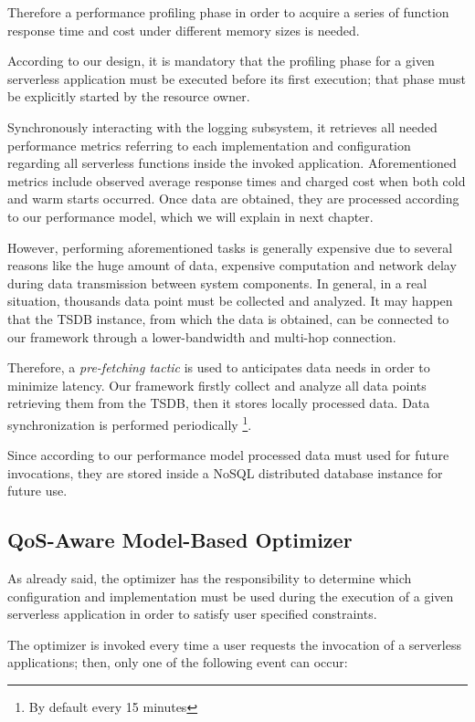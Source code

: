 \documentclass[12pt,a4paper]{report}
\begin{document}
Therefore a performance profiling phase in order to acquire a series of function response time and cost under different memory sizes is needed. 

According to our design, it is mandatory that the profiling phase for a given serverless application must be executed before its first execution; that phase must be explicitly started by the resource owner.

Synchronously interacting with the logging subsystem, it retrieves all needed performance metrics referring to each implementation and configuration regarding all serverless functions inside the invoked application. Aforementioned metrics include observed average response times and charged cost when both cold and warm starts occurred. Once data are obtained, they are processed according to our performance model, which we will explain in next chapter.

However, performing aforementioned tasks is generally expensive due to several reasons like the huge amount of data, expensive computation and network delay during data transmission between system components. In general, in a real situation, thousands data point must be collected and analyzed. It may happen that the TSDB instance, from which the data is obtained, can be connected to our framework through a lower-bandwidth and multi-hop connection. 

Therefore, a \textit{pre-fetching tactic} is used to anticipates data needs in order to minimize latency\cite{Tactics}. Our framework firstly collect and analyze all data points retrieving them from the TSDB, then it stores locally processed data. Data synchronization is performed periodically \footnote{By default every 15 minutes}.

Since according to our performance model processed data must used for future invocations, they are stored inside a NoSQL distributed database instance for future use.
	
\subsection{QoS-Aware Model-Based Optimizer}
	
As already said, the optimizer has the responsibility to determine which configuration and implementation must be used during the execution of a given serverless application in order to satisfy user specified constraints.

The optimizer is invoked every time a user requests the invocation of a serverless applications; then, only one of the following event can occur:
\end{document}
